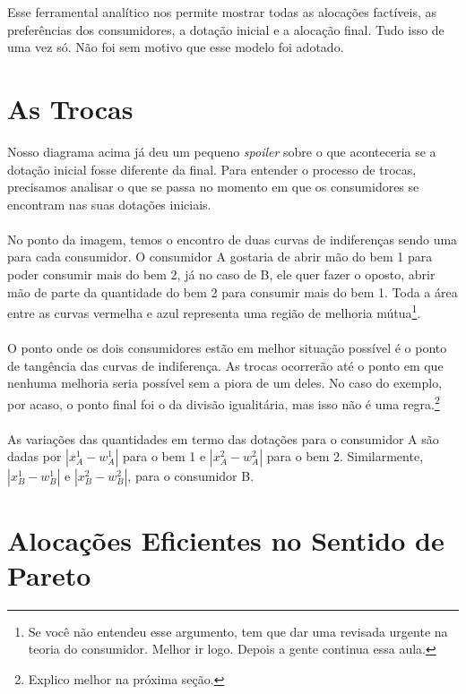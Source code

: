 \documentclass[a4paper,11pt,oneside]{book}
\theoremstyle{definition}
\theoremstyle{break}
\begin{document}
Esse ferramental analítico nos permite mostrar todas as alocações factíveis, as preferências dos consumidores, a dotação inicial e a alocação final. Tudo isso de uma vez só. Não foi sem motivo que esse modelo foi adotado.

\section{As Trocas}

Nosso diagrama acima já deu um pequeno \textit{spoiler} sobre o que aconteceria se a dotação inicial fosse diferente da final. Para entender o processo de trocas, precisamos analisar o que se passa no momento em que os consumidores se encontram nas suas dotações iniciais.
\\~\\
No ponto da imagem, temos o encontro de duas curvas de indiferenças sendo uma para cada consumidor. O consumidor A gostaria de abrir mão do bem 1 para poder consumir mais do bem 2, já no caso de B, ele quer fazer o oposto, abrir mão de parte da quantidade do bem 2 para consumir mais do bem 1. Toda a área entre as curvas vermelha e azul representa uma região de melhoria mútua\footnote{Se você não entendeu esse argumento, tem que dar uma revisada urgente na teoria do consumidor. Melhor ir logo. Depois a gente continua essa aula.}.
\\~\\
O ponto onde os dois consumidores estão em melhor situação possível é o ponto de tangência das curvas de indiferença. As trocas ocorrerão até o ponto em que nenhuma melhoria seria possível sem a piora de um deles. No caso do exemplo, por acaso, o ponto final foi o da divisão igualitária, mas isso não é uma regra.\footnote{Explico melhor na próxima seção.}
\\~\\
As variações das quantidades em termo das dotações para o consumidor A são dadas por $|x_A^1 - w_A^1|$ para o bem 1 e $|x_A^2 - w_A^2|$ para o bem 2. Similarmente, $|x_B^1 - w_B^1|$ e $|x_B^2 - w_B^2|$, para o consumidor B.

\section{Alocações Eficientes no Sentido de Pareto}
\end{document}
